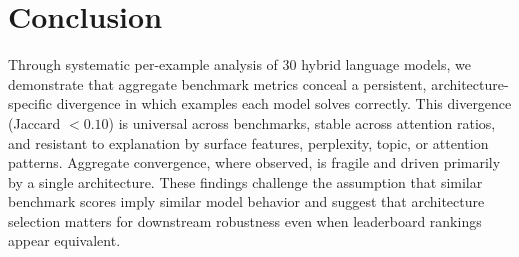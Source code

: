 \documentclass[11pt]{article}
\begin{document}
\section{Conclusion}

Through systematic per-example analysis of 30 hybrid language models, we demonstrate that aggregate benchmark metrics conceal a persistent, architecture-specific divergence in which examples each model solves correctly. This divergence (Jaccard $< 0.10$) is universal across benchmarks, stable across attention ratios, and resistant to explanation by surface features, perplexity, topic, or attention patterns. Aggregate convergence, where observed, is fragile and driven primarily by a single architecture. These findings challenge the assumption that similar benchmark scores imply similar model behavior and suggest that architecture selection matters for downstream robustness even when leaderboard rankings appear equivalent.


\end{document}
